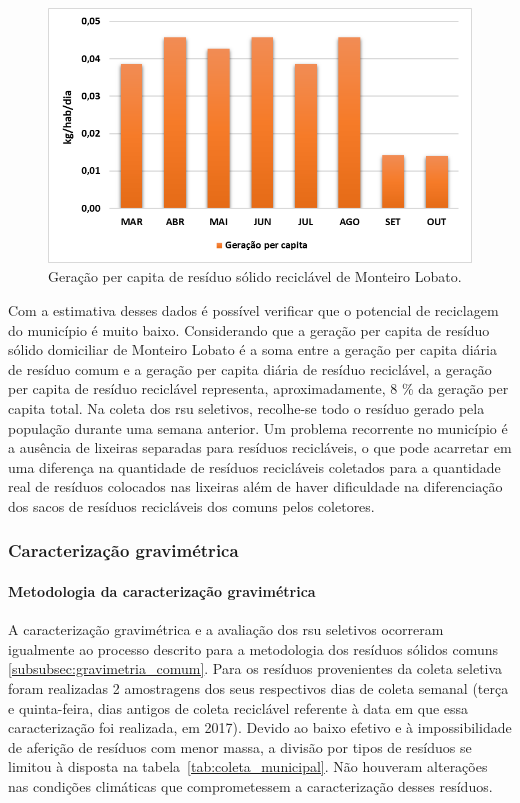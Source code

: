 \begin{figure}
	\centering
	\includegraphics[width=0.75\linewidth]{produtos/prodtres/image049}
	\caption{Geração per capita de resíduo sólido reciclável de Monteiro Lobato.}
	\label{fig:image049}
\end{figure}


Com a estimativa desses dados é possível verificar que o potencial de reciclagem do município é muito baixo. Considerando que a geração per capita de resíduo sólido domiciliar de Monteiro Lobato é a soma entre a geração per capita diária de resíduo comum e a geração per capita diária de resíduo reciclável, a geração per capita de resíduo reciclável representa, aproximadamente, 8 \% da geração per capita total.
Na coleta dos \gls{rsu} seletivos, recolhe-se todo o resíduo gerado pela população durante uma semana anterior. Um problema recorrente no município é a ausência de lixeiras separadas para resíduos recicláveis, o que pode acarretar em uma diferença na quantidade de resíduos recicláveis coletados para a quantidade real de resíduos colocados nas lixeiras além de haver dificuldade na diferenciação dos sacos de resíduos recicláveis dos comuns pelos coletores.

\subsubsection{Caracterização gravimétrica}

\paragraph{\textbf{Metodologia da caracterização gravimétrica}}


A caracterização gravimétrica e a avaliação dos \gls{rsu} seletivos ocorreram igualmente ao processo descrito para a metodologia dos resíduos sólidos comuns \ref{subsubsec:gravimetria_comum}. Para os resíduos provenientes da coleta seletiva foram realizadas 2 amostragens dos seus respectivos dias de coleta semanal (terça e quinta-feira, dias antigos de coleta reciclável referente à data em que essa caracterização foi realizada, em 2017). Devido ao baixo efetivo e à impossibilidade de aferição de resíduos com menor massa, a divisão por tipos de resíduos se limitou à disposta na tabela~\ref{tab:coleta_municipal}. Não houveram alterações nas condições climáticas que comprometessem a caracterização desses resíduos.


